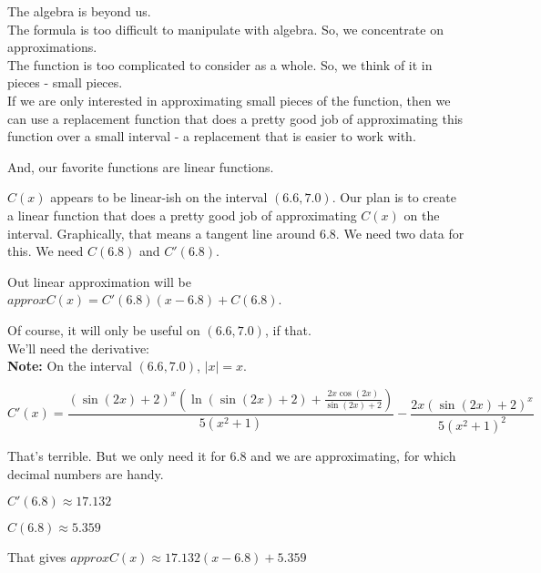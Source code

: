 \documentclass{ximera}
\begin{document}
The algebra is beyond us. \\




The formula is too difficult to manipulate with algebra.  So, we concentrate on approximations. \\ 


The function is too complicated to consider as a whole. So, we think of it in pieces - small pieces. \\






If we are only interested in approximating small pieces of the function, then we can use a replacement function that does a pretty good job of approximating this function over a small interval - a replacement that is easier to work with.

And, our favorite functions are linear functions.


$C(x)$ appears to be linear-ish on the interval $(6.6, 7.0)$. Our plan is to create a linear function that does a pretty good job of approximating $C(x)$ on the interval. Graphically, that means a tangent line around $6.8$.  We need two data for this.  We need $C(6.8)$ and $C'(6.8)$.





Out linear approximation will be $approxC(x) = C'(6.8)(x-6.8) + C(6.8)$.

Of course, it will only be useful on $(6.6, 7.0)$, if that. \\




We'll need the derivative: \\
\textbf{Note:} On the interval $(6.6, 7.0)$, $| x | = x$.

\[  
C'(x) = \frac{(\sin(2x)+2)^x (\ln(\sin(2x)+2) + \frac{2 x \cos(2x)}{\sin(2x)+2})}{5(x^2+1)} - \frac{2x(\sin(2x)+2)^x}{5(x^2+1)^2}
\]




That's terrible.  But we only need it for $6.8$ and we are approximating, for which decimal numbers are handy.

$C'(6.8) \approx 17.132$


$C(6.8) \approx 5.359$


That gives $approxC(x) \approx 17.132(x-6.8)+5.359$
\end{document}
